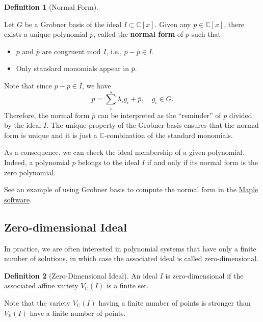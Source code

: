 \documentclass[
]{book}
\theoremstyle{definition}
\newtheorem{definition}{Definition}[chapter]
\theoremstyle{definition}
\theoremstyle{definition}
\theoremstyle{definition}
\theoremstyle{remark}
\begin{document}
\begin{definition}[Normal Form]
\protect\hypertarget{def:NormalForm}{}\label{def:NormalForm}

Let \(G\) be a Grobner basis of the ideal \(I \subset \mathbb{C}[x]\). Given any \(p \in \mathbb{C}[x]\), there exists a unique polynomial \(\bar{p}\), called the \textbf{normal form} of \(p\) such that

\begin{itemize}
\item
  \(p\) and \(\bar{p}\) are congruent mod \(I\), i.e., \(p - \bar{p} \in I\).
\item
  Only standard monomials appear in \(\bar{p}\).
\end{itemize}

\end{definition}

Note that since \(p - \bar{p} \in I\), we have
\[
p = \sum_{i}^s\lambda_i g_i + \bar{p}, \quad g_i \in G.
\]
Therefore, the normal form \(\bar{p}\) can be interpreted as the ``reminder'' of \(p\) divided by the ideal \(I\). The unique property of the Grobner basis ensures that the normal form is unique and it is just a \(\mathbb{C}\)-combination of the standard monomials.

As a consequence, we can check the ideal membership of a given polynomial. Indeed, a polynomial \(p\) belongs to the ideal \(I\) if and only if its normal form is the zero polynomial.

See an example of using Grobner basis to compute the normal form in the \href{https://www.maplesoft.com/support/help/maple/view.aspx?path=Groebner\%2FNormalForm}{Maple software}.

\subsection{Zero-dimensional Ideal}\label{zero-dimensional-ideal}

In practice, we are often interested in polynomial systems that have only a finite number of solutions, in which case the associated ideal is called zero-dimensional.

\begin{definition}[Zero-Dimensional Ideal]
\protect\hypertarget{def:ZeroDimensional}{}\label{def:ZeroDimensional}An ideal \(I\) is zero-dimensional if the associated affine variety \(V_{\mathbb{C}}(I)\) is a finite set.
\end{definition}

Note that the variety \(V_{\mathbb{C}}(I)\) having a finite number of points is stronger than \(V_{\mathbb{R}}(I)\) have a finite number of points.
\end{document}
